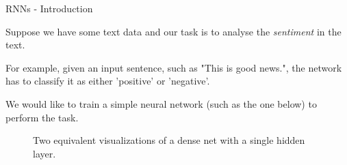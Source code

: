 
\begin{frame} {RNNs - Introduction}
  \begin{itemize}
    \item \small{Suppose we have some text data and our task is to analyse the \textit{sentiment} in the text.
    \item For example, given an input sentence, such as "This is good news.", the network has to classify it as either 'positive' or 'negative'.
    \item We would like to train a simple neural network (such as the one below) to perform the task.}
  \end{itemize}
  \begin{figure}
      \centering
      \caption{\footnotesize{Two equivalent visualizations of a dense net with a single hidden layer.}}
  \end{figure}
\end{frame}

